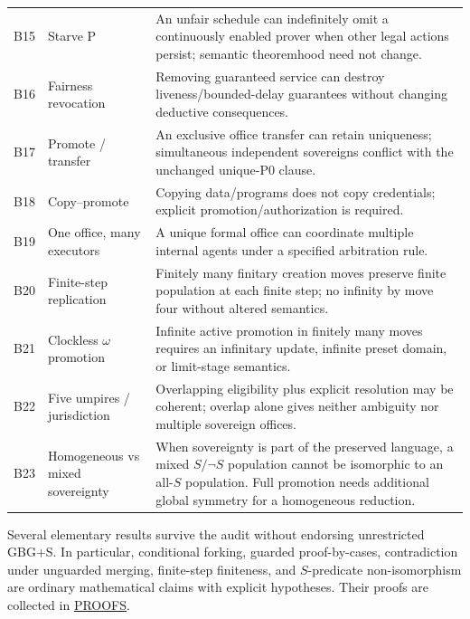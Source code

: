 \documentclass[11pt,letterpaper]{article}
\theoremstyle{definition}\newtheorem{definition}[theorem]{Definition}\newtheorem{example}[theorem]{Example}
\theoremstyle{remark}\newtheorem{remark}[theorem]{Remark}
\begin{document}
\begin{longtable}{@{}p{}p{}p{}@{}}
B15&Starve P&An unfair schedule can indefinitely omit a continuously enabled prover when other legal actions persist; semantic theoremhood need not change.\tabularnewline
B16&Fairness revocation&Removing guaranteed service can destroy liveness/bounded-delay guarantees without changing deductive consequences.\tabularnewline
B17&Promote / transfer&An exclusive office transfer can retain uniqueness; simultaneous independent sovereigns conflict with the unchanged unique-P0 clause.\tabularnewline
B18&Copy--promote&Copying data/programs does not copy credentials; explicit promotion/authorization is required.\tabularnewline
B19&One office, many executors&A unique formal office can coordinate multiple internal agents under a specified arbitration rule.\tabularnewline
B20&Finite-step replication&Finitely many finitary creation moves preserve finite population at each finite step; no infinity by move four without altered semantics.\tabularnewline
B21&Clockless $\omega$ promotion&Infinite active promotion in finitely many moves requires an infinitary update, infinite preset domain, or limit-stage semantics.\tabularnewline
B22&Five umpires / jurisdiction&Overlapping eligibility plus explicit resolution may be coherent; overlap alone gives neither ambiguity nor multiple sovereign offices.\tabularnewline
B23&Homogeneous vs mixed sovereignty&When sovereignty is part of the preserved language, a mixed $S/\neg S$ population cannot be isomorphic to an all-$S$ population. Full promotion needs additional global symmetry for a homogeneous reduction.\tabularnewline
\bottomrule
\end{longtable}
\normalsize

Several elementary results survive the audit without endorsing unrestricted GBG+S. In particular, conditional forking, guarded proof-by-cases, contradiction under unguarded merging, finite-step finiteness, and $S$-predicate non-isomorphism are ordinary mathematical claims with explicit hypotheses. Their proofs are collected in \hyperref[w0:sec:proofs]{PROOFS}.
\end{document}
